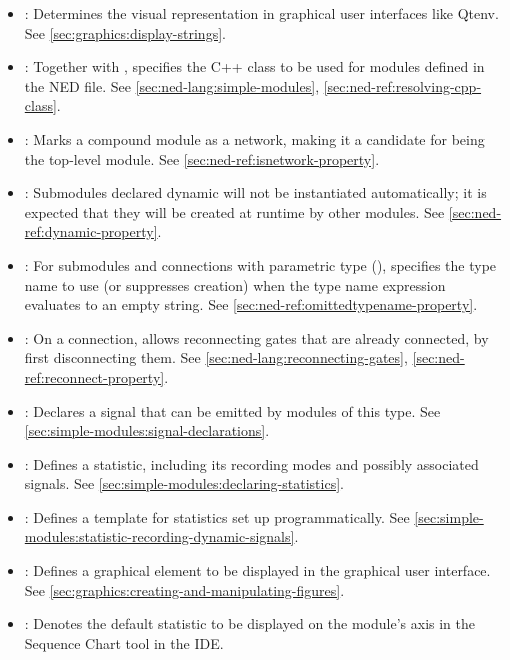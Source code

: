 \begin{itemize}
  \item {}: Determines the visual representation in
    graphical user interfaces like Qtenv. See
    \ref{sec:graphics:display-strings}.
  \item {}: Together with ,
    specifies the C++ class to be used for modules defined in the NED file. See
    \ref{sec:ned-lang:simple-modules}, \ref{sec:ned-ref:resolving-cpp-class}.
  \item {}: Marks a compound module as a network, making it a
    candidate for being the top-level module. See
    \ref{sec:ned-ref:isnetwork-property}.
  \item {}: Submodules declared dynamic will not be instantiated
    automatically; it is expected that they will be created at runtime by other
    modules. See \ref{sec:ned-ref:dynamic-property}.
  \item {}: For submodules and connections with parametric
    type (), specifies the type name to use (or suppresses
    creation) when the type name expression evaluates to an empty string. See
    \ref{sec:ned-ref:omittedtypename-property}.
  \item {}: On a connection, allows reconnecting gates that
    are already connected, by first disconnecting them. See
    \ref{sec:ned-lang:reconnecting-gates}, \ref{sec:ned-ref:reconnect-property}.
  \item {}: Declares a signal that can be
    emitted by modules of this type. See
    \ref{sec:simple-modules:signal-declarations}.
  \item {}: Defines a statistic, including its
    recording modes and possibly associated signals. See
    \ref{sec:simple-modules:declaring-statistics}.
  \item {}: Defines a template for
    statistics set up programmatically. See
    \ref{sec:simple-modules:statistic-recording-dynamic-signals}.
  \item {}: Defines a graphical element to be
    displayed in the graphical user interface. See
    \ref{sec:graphics:creating-and-manipulating-figures}.
  \item {}: Denotes the default statistic to be
    displayed on the module's axis in the Sequence Chart tool in the IDE.
\end{itemize}

